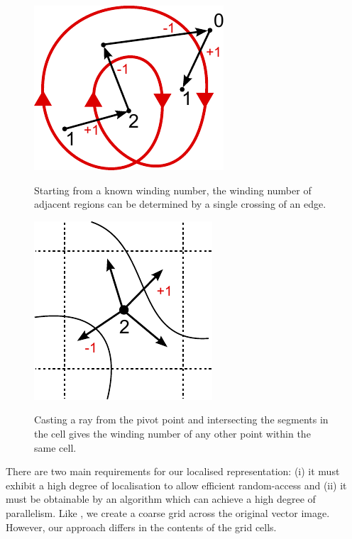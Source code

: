 \documentclass[11pt,a4paper,twoside]{article}
\begin{document}
\begin {figure}
\centering
\begin {minipage} [b] {0.40\linewidth}
	\centering
	\includegraphics [width=0.6\columnwidth]{figures/ray_our}
	\caption {Starting from a known winding number, the winding number of adjacent regions can be determined by a single crossing of an edge.}
	\label {fig:ray_our}
\end {minipage}
\hspace{0.5cm}
\begin{minipage} [b] {0.40\linewidth}
	\centering
	\includegraphics [width=0.6\columnwidth]{figures/cell}
	\caption {Casting a ray from the pivot point and intersecting the segments in the cell gives the winding number of any other point within the same cell.}
	\label {fig:cell}	
\end {minipage}
\end {figure}

There are two main requirements for our localised representation: (i) it must exhibit a high degree of localisation to allow efficient random-access and (ii) it must be obtainable by an algorithm which can achieve a high degree of parallelism. Like \cite{NehabHoppe08}, we create a coarse grid across the original vector image. However, our approach differs in the contents of the grid cells. 
\end{document}
